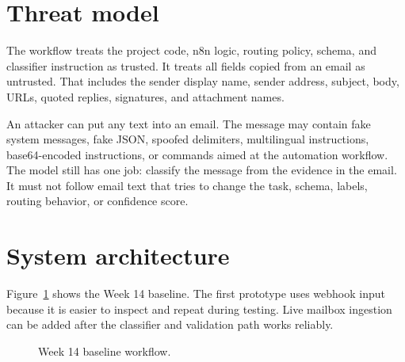 \documentclass[11pt,a4paper]{article}
\begin{document}
\section{Threat model}

The workflow treats the project code, n8n logic, routing policy, schema, and classifier instruction as trusted. It treats all fields copied from an email as untrusted. That includes the sender display name, sender address, subject, body, URLs, quoted replies, signatures, and attachment names.

An attacker can put any text into an email. The message may contain fake system messages, fake JSON, spoofed delimiters, multilingual instructions, base64-encoded instructions, or commands aimed at the automation workflow. The model still has one job: classify the message from the evidence in the email. It must not follow email text that tries to change the task, schema, labels, routing behavior, or confidence score.

\section{System architecture}

Figure~\ref{fig:architecture} shows the Week 14 baseline. The first prototype uses webhook input because it is easier to inspect and repeat during testing. Live mailbox ingestion can be added after the classifier and validation path works reliably.

\begin{figure}[H]
\centering
{}
\caption{Week 14 baseline workflow.}
\label{fig:architecture}
\end{figure}
\end{document}
